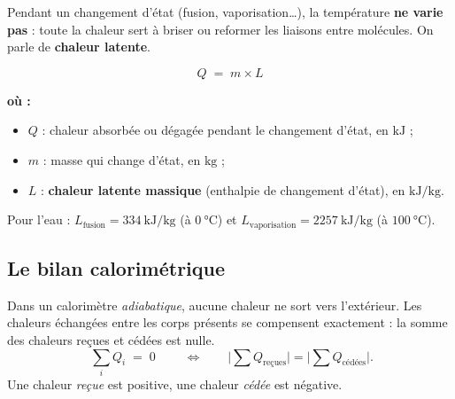 \documentclass[11pt,a4paper]{article}
\newenvironment{ou}{%
  \par\smallskip\noindent\textbf{où :}\nopagebreak
  \begin{itemize}[leftmargin=1.8em,topsep=2pt,itemsep=1.5pt,parsep=0pt]}%
  {\end{itemize}}
\begin{document}
Pendant un changement d'état (fusion, vaporisation\ldots), la température \textbf{ne varie pas} : toute
la chaleur sert à briser ou reformer les liaisons entre molécules. On parle de \textbf{chaleur latente}.

\begin{formule}
\[ \boxed{\;Q \;=\; m \times L\;} \]
\begin{ou}
  \item $Q$ : chaleur absorbée ou dégagée pendant le changement d'état, en $\si{\kilo\joule}$ ;
  \item $m$ : masse qui change d'état, en $\si{\kilogram}$ ;
  \item $L$ : \textbf{chaleur latente massique} (enthalpie de changement d'état), en $\si{\kilo\joule\per\kilogram}$.
\end{ou}
\end{formule}

Pour l'eau : $L_{\text{fusion}} = \SI{334}{\kilo\joule\per\kilogram}$ (à $\SI{0}{\celsius}$) et
$L_{\text{vaporisation}} = \SI{2257}{\kilo\joule\per\kilogram}$ (à $\SI{100}{\celsius}$).

\subsection{Le bilan calorimétrique}

\begin{theoreme}
Dans un calorimètre \emph{adiabatique}, aucune chaleur ne sort vers l'extérieur. Les chaleurs échangées
entre les corps présents se compensent exactement : la somme des chaleurs reçues et cédées est nulle.
\[ \boxed{\;\textstyle\sum_i Q_i \;=\; 0\;}\qquad\Longleftrightarrow\qquad
   \big|\textstyle\sum Q_{\text{reçues}}\big| = \big|\textstyle\sum Q_{\text{cédées}}\big|. \]
Une chaleur \emph{reçue} est positive, une chaleur \emph{cédée} est négative.
\end{theoreme}
\end{document}
